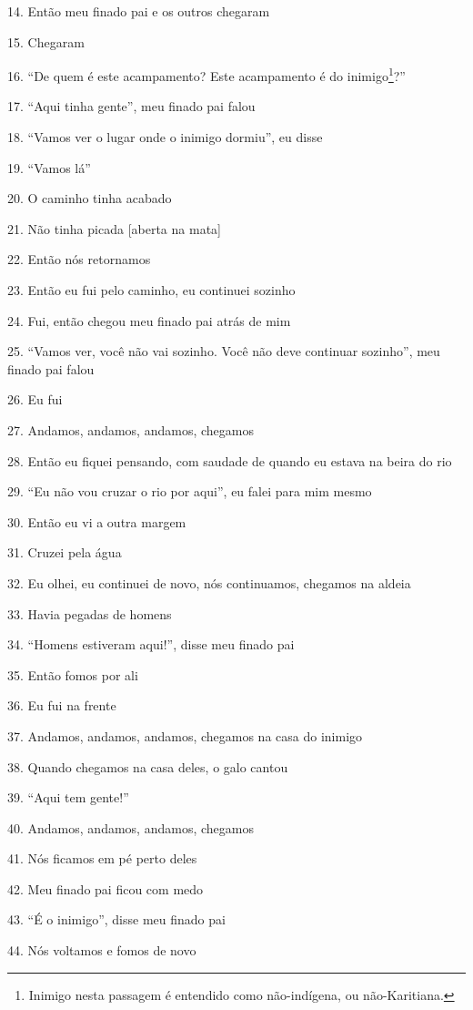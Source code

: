 14. Então meu finado pai e os outros chegaram

15. Chegaram

16. ``De quem é este acampamento? Este acampamento é do inimigo\footnote{Inimigo
  nesta passagem é entendido como não-indígena, ou não-Karitiana.}?''

17. ``Aqui tinha gente'', meu finado pai falou

18. ``Vamos ver o lugar onde o inimigo dormiu'', eu disse

19. ``Vamos lá''

20. O caminho tinha acabado

21. Não tinha picada {[}aberta na mata{]}

22. Então nós retornamos

23. Então eu fui pelo caminho, eu continuei sozinho

24. Fui, então chegou meu finado pai atrás de mim

25. ``Vamos ver, você não vai sozinho. Você não deve continuar sozinho'',
meu finado pai falou

26. Eu fui

27. Andamos, andamos, andamos, chegamos

28. Então eu fiquei pensando, com saudade de quando eu estava na beira do
rio

29. ``Eu não vou cruzar o rio por aqui'', eu falei para mim mesmo

30. Então eu vi a outra margem

31. Cruzei pela água

32. Eu olhei, eu continuei de novo, nós continuamos, chegamos na aldeia

33. Havia pegadas de homens

34. ``Homens estiveram aqui!'', disse meu finado pai

35. Então fomos por ali

36. Eu fui na frente

37. Andamos, andamos, andamos, chegamos na casa do inimigo

38. Quando chegamos na casa deles, o galo cantou

39. ``Aqui tem gente!''

40. Andamos, andamos, andamos, chegamos

41. Nós ficamos em pé perto deles

42. Meu finado pai ficou com medo

43. ``É o inimigo'', disse meu finado pai

44. Nós voltamos e fomos de novo

